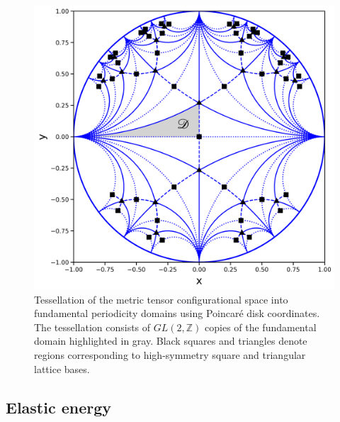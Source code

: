 \documentclass[aps,
superscriptaddress,notitlepage]{revtex4-1}
\begin{document}
\begin{figure}[ht!]
\centering
\includegraphics[scale=0.8]{figures_ordering/figure_01.png}
\caption{Tessellation of the metric tensor configurational space into fundamental periodicity domains using Poincaré disk coordinates. The tessellation consists of $GL(2, \mathbb{Z})$ copies of the fundamental domain highlighted in gray. Black squares and triangles denote regions corresponding to high-symmetry square and triangular lattice bases.}
\label{fig:atlas0}
\end{figure}



\subsection{Elastic energy}
\end{document}
